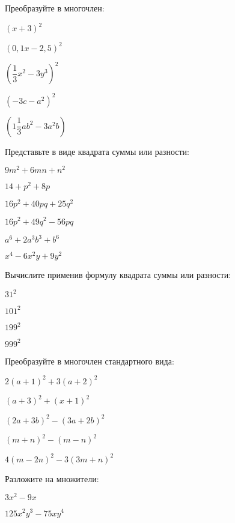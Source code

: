 \begin{listofex}
	\item Преобразуйте в многочлен:
	\begin{enumcols}[itemcolumns=3]
		\item \( (x+3)^2 \)
		\item \( (0,1x-2,5)^2 \)
		\item \( \left( \dfrac{1}{3}x^2-3y^3 \right)^2 \)
		\item \( (-3c-a^2)^2 \)
		\item \( \left( 1\dfrac{1}{3}ab^2-3a^2b \right) \)
	\end{enumcols}
	\item Представьте в виде квадрата суммы или разности:
	\begin{enumcols}[itemcolumns=3]
		\item \( 9m^2+6mn+n^2 \)
		\item \( 14+p^2+8p \)
		\item \( 16p^2+40pq+25q^2 \)
		\item \( 16p^2+49q^2-56pq \)
		\item \( a^6+2a^3b^3+b^6 \)
		\item \( x^4-6x^2y+9y^2 \)
	\end{enumcols}
	\item Вычислите применив формулу квадрата суммы или разности:
	\begin{enumcols}[itemcolumns=4]
		\item \( 31^2 \)
		\item \( 101^2 \)
		\item \( 199^2 \)
		\item \( 999^2 \)
	\end{enumcols}
	\item Преобразуйте в многочлен стандартного вида:
	\begin{enumcols}[itemcolumns=2]
		\item \( 2(a+1)^2 +3(a+2)^2\)
		\item \( (a+3)^2+(x+1)^2\)
		\item \( (2a+3b)^2-(3a+2b)^2 \)
		\item \( (m+n)^2-(m-n)^2 \)
		\item \( 4(m-2n)^2-3(3m+n)^2 \)
	\end{enumcols}
	\item Разложите на множители:
	\begin{enumcols}[itemcolumns=3]
		\item \( 3x^2-9x \)
		\item \( 125x^2y^3-75xy^4 \)

\end{enumcols}
\end{listofex}
